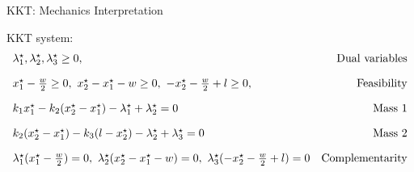 \documentclass[9pt]{beamer}
\begin{document}
\begin{frame}{KKT: Mechanics Interpretation}

  \begin{center}
    
  \end{center}
  
  \vfill

  KKT system: 
  \[
    \begin{array}{lr}
      \lambda^\star_1, \lambda^\star_2, \lambda^\star_3 \geq 0, & \rm{Dual~variables}\\[1em]
      x^\star_1 - \frac{w}{2}\geq 0, ~x^\star_2-x^\star_1 - w \geq 0 ,~ -x^\star_2 - \frac{w}{2} + l\geq 0, & \rm{Feasibility}\\[1em]
      k_1 x_1^\star - k_2(x_2^\star-x_1^\star) - \lambda^\star_1 + \lambda^\star_2 = 0 & \rm{Mass~1} \\[1em]
      k_2 (x_2^\star-x_1^\star) - k_3 (l-x_2^\star) -\lambda^\star_2 + \lambda_3^\star = 0 & \rm{Mass~2} \\[1em]
      \lambda_1^\star(x^\star_1 - \frac{w}{2})=0, ~\lambda_2^\star(x^\star_2-x^\star_1 - w)=0, ~\lambda_3^\star(-x^\star_2 - \frac{w}{2} + l) = 0 & \rm{Complementarity}
    \end{array}
  \]

\end{frame}
\end{document}
